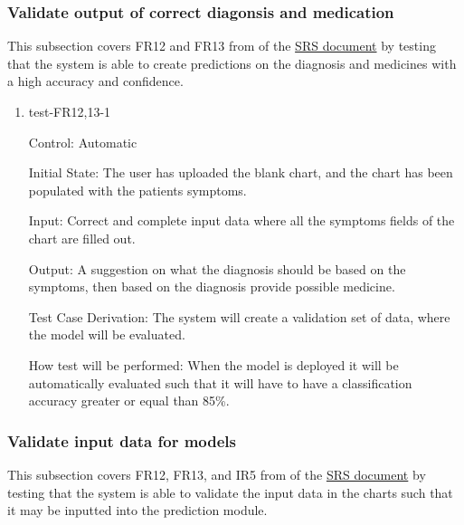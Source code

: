 \documentclass[12pt, titlepage]{article}
\begin{document}
\subsubsection{Validate output of correct diagonsis and medication} \label{section:4.1.6}

This subsection covers FR12 and FR13 from of the \href{https://github.com/Inreet-Kaur/capstone/blob/main/docs/SRS/SRS.pdf}{SRS document} \citep{SRS} by testing that the system is able to create predictions on the diagnosis and medicines with a high accuracy and confidence.

\begin{enumerate}

\item{test-FR12,13-1} \label{test-FR12,13-1}

Control: Automatic

Initial State: The user has uploaded the blank chart, and the chart has been populated with the patients symptoms.

Input: Correct and complete input data where all the symptoms fields of the chart are filled out.

Output: A suggestion on what the diagnosis should be based on the symptoms, then based on the diagnosis provide possible medicine.

Test Case Derivation: The system will create a validation set of data, where the model will be evaluated. 

How test will be performed: When the model is deployed it will be automatically evaluated such that it will have to have a classification accuracy greater or equal than 85\%.

\end{enumerate}


\subsubsection{Validate input data for models} \label{section:4.1.7}
This subsection covers FR12, FR13, and IR5 from of the \href{https://github.com/Inreet-Kaur/capstone/blob/main/docs/SRS/SRS.pdf}{SRS document} \citep{SRS} by testing that the system is able to validate the input data in the charts such that it may be inputted into the prediction module.
\end{document}
